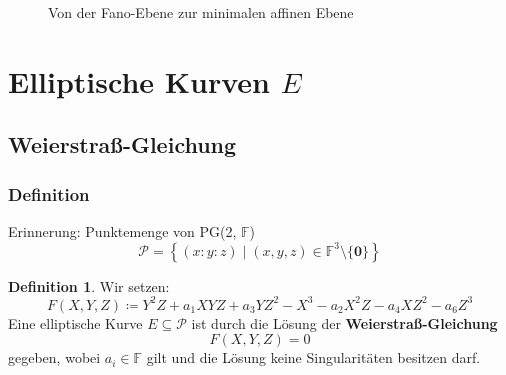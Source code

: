 \documentclass{beamer}
\theoremstyle{plain}
\theoremstyle{definition}
\newtheorem{defn}[thm]{Definition}
\theoremstyle{rem}
\newcommand{\pgtwo}{PG(2, $\mathbb{F}$)\ }
\newcommand{\ftnz}{\mathbb{F}^{3}\setminus\{\boldsymbol 0\}}
\begin{document}
\begin{frame}
\begin{figure}[H]
{{{}}
        }
        \caption{Von der Fano-Ebene zur minimalen affinen Ebene}
    \end{figure}
\end{frame}

\section{Elliptische Kurven $E$}

\subsection{Weierstraß-Gleichung}

\begin{frame}
\frametitle{Definition}
Erinnerung: Punktemenge von \pgtwo
\begin{equation*}
	\mathcal{P} = \left\{(x:y:z) \mid (x,y,z) \in \ftnz \right\}
\end{equation*}
\vspace{-6mm}
\pause
\begin{defn}
Wir setzen:
\vspace{-3mm}
\begin{equation*}
	    F(X,Y,Z)\coloneqq Y^2Z + a_1XYZ + a_3YZ^2 - X^3 - a_2X^2Z - a_4XZ^2 - a_6Z^3
\end{equation*}
Eine elliptische Kurve $E\subseteq \mathcal{P}$ ist durch die Lösung der \textbf{Weierstraß-Gleichung}
\vspace{-3mm}
\begin{equation*}
	    F(X,Y,Z)=0
\end{equation*}
        gegeben, wobei $a_i \in \mathbb{F}$ gilt und die Lösung keine Singularitäten besitzen darf.
\end{defn}
\end{frame}
\end{document}

